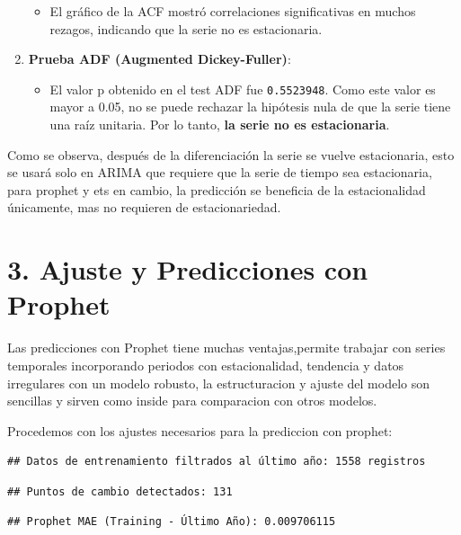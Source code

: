 \documentclass[
]{book}
\providecommand{\tightlist}{%
  \setlength{\itemsep}{0pt}\setlength{\parskip}{0pt}}
\begin{document}
\begin{enumerate}
  \begin{itemize}
  \tightlist
  \item
    El gráfico de la ACF mostró correlaciones significativas en muchos rezagos, indicando que la serie no es estacionaria.
  \end{itemize}
\item
  \textbf{Prueba ADF (Augmented Dickey-Fuller)}:

  \begin{itemize}
  \tightlist
  \item
    El valor p obtenido en el test ADF fue \texttt{0.5523948}. Como este valor es mayor a 0.05, no se puede rechazar la hipótesis nula de que la serie tiene una raíz unitaria. Por lo tanto, \textbf{la serie no es estacionaria}.
  \end{itemize}
\end{enumerate}

Como se observa, después de la diferenciación la serie se vuelve estacionaria, esto se usará solo en ARIMA que requiere que la serie de tiempo sea estacionaria, para prophet y ets en cambio, la predicción se beneficia de la estacionalidad únicamente, mas no requieren de estacionariedad.

\section{3. Ajuste y Predicciones con Prophet}\label{ajuste-y-predicciones-con-prophet}

Las predicciones con Prophet tiene muchas ventajas,permite trabajar con series temporales incorporando periodos con estacionalidad, tendencia y datos irregulares con un modelo robusto, la estructuracion y ajuste del modelo son sencillas y sirven como inside para comparacion con otros modelos.

Procedemos con los ajustes necesarios para la prediccion con prophet:

\begin{verbatim}
## Datos de entrenamiento filtrados al último año: 1558 registros
\end{verbatim}

\begin{verbatim}
## Puntos de cambio detectados: 131
\end{verbatim}

\begin{verbatim}
## Prophet MAE (Training - Último Año): 0.009706115
\end{verbatim}
\end{document}
